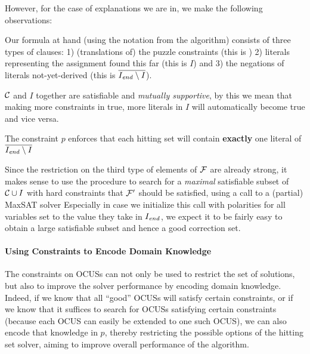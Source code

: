 However, for the case of explanations we are in, we make the following observations: 
\begin{compactitem}
 \item Our formula at hand (using the notation from the \onestep algorithm) consists of three types of clauses: 1) (translations of) the puzzle constraints (this is \formulac) 2) literals representing the assignment found this far (this is $I$) and 3) the negations of literals not-yet-derived (this is $\overline{I_\mathit{end} \setminus I}$). 
 \item $\mathcal{C} $ and $I$ together are satisfiable and \emph{mutually supportive}, by this we mean that making more constraints in \formulac true, more literals in $I$ will automatically become true and vice versa. 
 \item The constraint $p$ enforces that each hitting set will contain \textbf{exactly} one literal of  $\overline{I_\mathit{end} \setminus I}$
\end{compactitem}
Since the restriction on the third type of elements of $\mathcal{F} $ are already strong, it makes sense to use the \grow procedure to search for a \emph{maximal} satisfiable subset of $\mathcal{C} \cup I$ with hard constraints that $\mathcal{F} '$ should be satisfied, using a call to a  (partial) MaxSAT solver Especially in case we initialize this call with  polarities for all variables set to the value they take in $I_\mathit{end} $, we expect it to be fairly easy to obtain a large satisfiable subset and hence a good correction set. 





\paragraph{Using Constraints to Encode Domain Knowledge}

The constraints on OCUSs can not only be used to restrict the set of solutions, but also to improve the solver performance by encoding domain knowledge.
Indeed, if we know that all ``good'' OCUSs will satisfy certain constraints, or if we know that it suffices to search for OCUSs satisfying certain constraints (because each OCUS can easily be extended to one such OCUS),  we can also encode that knowledge in $p$, thereby restricting the possible options of the hitting set solver, aiming to improve overall performance of the algorithm. 

